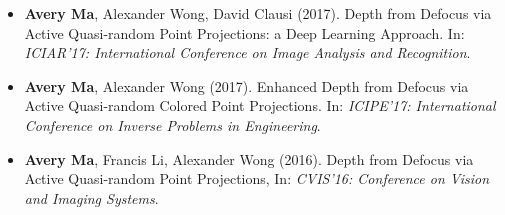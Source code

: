 \begin{adjustwidth}{\indentleft}{\indentright}
\begin{itemize}
            
            \item \textbf{Avery Ma}, Alexander Wong, David Clausi (2017). Depth from Defocus via Active Quasi-random Point Projections: a Deep Learning Approach. In: \emph{ICIAR'17: International Conference on Image Analysis and Recognition}.
            
            \item \textbf{Avery Ma}, Alexander Wong (2017). Enhanced Depth from Defocus via Active Quasi-random Colored Point Projections. In: \emph{ICIPE'17: International Conference on Inverse Problems in Engineering}.
                   
            \item \textbf{Avery Ma}, Francis Li, Alexander Wong (2016). Depth from Defocus via Active Quasi-random Point Projections, In: \emph{CVIS'16: Conference on Vision and Imaging Systems}.
       
        \end{itemize}
        \hfill
        
        
 
        
    \end{adjustwidth}
